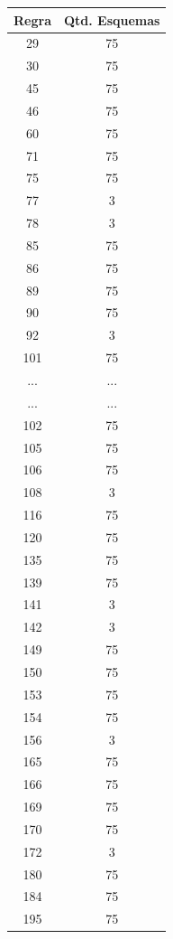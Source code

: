 \documentclass[a4paper,12pt]{ltxdoc}
\begin{document}
\begin{center}
\begin{longtable}{ | c | c | } \hline
 Regra & Qtd. Esquemas     \\\hline
  29 & 75  \\ \hline
  30 & 75  \\ \hline
  45 & 75  \\ \hline
  46 & 75  \\ \hline
  60 & 75  \\ \hline
  71 & 75  \\ \hline
  75 & 75  \\ \hline
  77 & 3   \\ \hline
  78 & 3   \\ \hline
  85 & 75  \\ \hline
  86 & 75  \\ \hline
  89 & 75  \\ \hline
  90 & 75  \\ \hline
  92 & 3   \\ \hline
  101 & 75 \\ \hline
  ... & ... \\ \hline
  ... & ... \\ \hline
  102 & 75 \\ \hline
  105 & 75 \\ \hline
  106 & 75 \\ \hline
  108 & 3  \\ \hline
  116 & 75 \\ \hline
  120 & 75 \\ \hline
  135 & 75 \\ \hline
  139 & 75 \\ \hline
  141 & 3  \\ \hline
  142 & 3  \\ \hline
  149 & 75 \\ \hline
  150 & 75 \\ \hline
  153 & 75 \\ \hline
  154 & 75 \\ \hline
  156 & 3  \\ \hline
  165 & 75 \\ \hline
  166 & 75 \\ \hline
  169 & 75 \\ \hline
  170 & 75 \\ \hline
  172 & 3  \\ \hline
  180 & 75 \\ \hline
  184 & 75 \\ \hline
  195 & 75 \\ \hline

\end{longtable}
\end{center}
\end{document}
